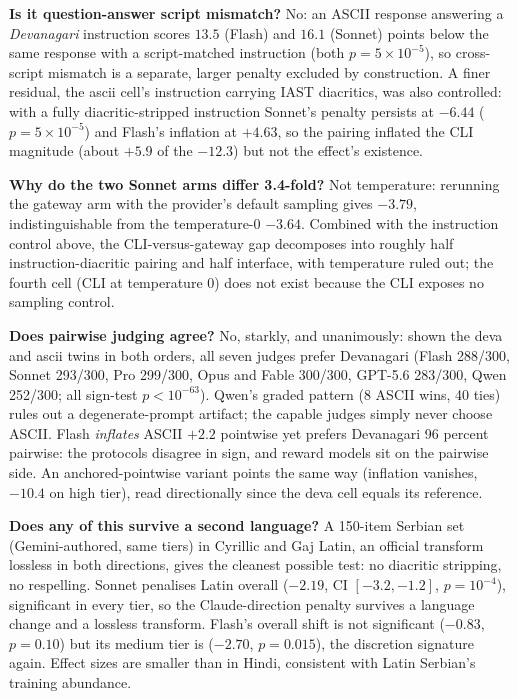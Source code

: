 \textbf{Is it question-answer script mismatch?} No: an ASCII response answering a \emph{Devanagari} instruction scores $13.5$ (Flash) and $16.1$ (Sonnet) points below the same response with a script-matched instruction (both $p = 5 \times 10^{-5}$), so cross-script mismatch is a separate, larger penalty excluded by construction. A finer residual, the ascii cell's instruction carrying IAST diacritics, was also controlled: with a fully diacritic-stripped instruction Sonnet's penalty persists at $-6.44$ ($p = 5 \times 10^{-5}$) and Flash's inflation at $+4.63$, so the pairing inflated the CLI magnitude (about $+5.9$ of the $-12.3$) but not the effect's existence.

\textbf{Why do the two Sonnet arms differ 3.4-fold?} Not temperature: rerunning the gateway arm with the provider's default sampling gives $-3.79$, indistinguishable from the temperature-0 $-3.64$. Combined with the instruction control above, the CLI-versus-gateway gap decomposes into roughly half instruction-diacritic pairing and half interface, with temperature ruled out; the fourth cell (CLI at temperature 0) does not exist because the CLI exposes no sampling control.

\textbf{Does pairwise judging agree?} No, starkly, and unanimously: shown the deva and ascii twins in both orders, all seven judges prefer Devanagari (Flash 288/300, Sonnet 293/300, Pro 299/300, Opus and Fable 300/300, GPT-5.6 283/300, Qwen 252/300; all sign-test $p < 10^{-63}$). Qwen's graded pattern (8 ASCII wins, 40 ties) rules out a degenerate-prompt artifact; the capable judges simply never choose ASCII. Flash \emph{inflates} ASCII $+2.2$ pointwise yet prefers Devanagari 96 percent pairwise: the protocols disagree in sign, and reward models sit on the pairwise side. An anchored-pointwise variant points the same way (inflation vanishes, $-10.4$ on high tier), read directionally since the deva cell equals its reference.

\textbf{Does any of this survive a second language?} A 150-item Serbian set (Gemini-authored, same tiers) in Cyrillic and Gaj Latin, an official transform lossless in both directions, gives the cleanest possible test: no diacritic stripping, no respelling. Sonnet penalises Latin overall ($-2.19$, CI $[-3.2, -1.2]$, $p = 10^{-4}$), significant in every tier, so the Claude-direction penalty survives a language change and a lossless transform. Flash's overall shift is not significant ($-0.83$, $p = 0.10$) but its medium tier is ($-2.70$, $p = 0.015$), the discretion signature again. Effect sizes are smaller than in Hindi, consistent with Latin Serbian's training abundance.

